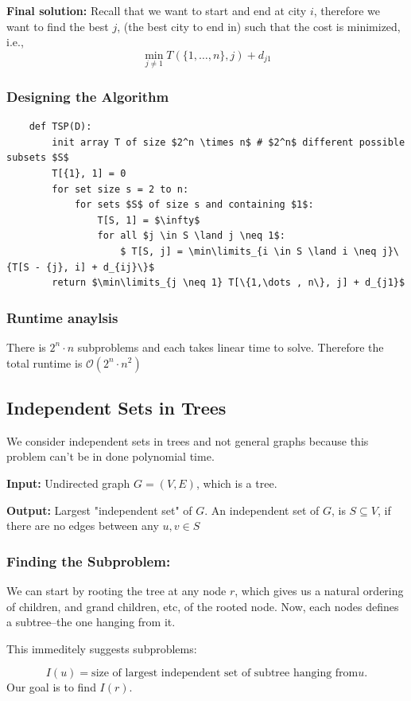 \documentclass[12pt]{article}
\renewcommand{\O}{\mathcal{O}}
\begin{document}
\textbf{Final solution: } Recall that we want to start and end at city $i$, therefore we want to find the best $j$, (the best city to end in) such that the cost is minimized, i.e.,
$$
    \min\limits_{j \neq 1} T(\{1,\dots , n\}, j) + d_{j1}
$$

\subsubsection{Designing the Algorithm}
\begin{lstlisting}
    def TSP(D):
        init array T of size $2^n \times n$ # $2^n$ different possible subsets $S$
        T[{1}, 1] = 0
        for set size s = 2 to n:
            for sets $S$ of size s and containing $1$:
                T[S, 1] = $\infty$
                for all $j \in S \land j \neq 1$:
                    $ T[S, j] = \min\limits_{i \in S \land i \neq j}\{T[S - {j}, i] + d_{ij}\}$
        return $\min\limits_{j \neq 1} T[\{1,\dots , n\}, j] + d_{j1}$
\end{lstlisting}
\subsubsection{Runtime anaylsis}
There is $2^n \cdot n$ subproblems and each takes linear time to solve. Therefore the total runtime is $\O(2^n\cdot n^2)$

\subsection{Independent Sets in Trees}
We consider independent sets in trees and not general graphs because this problem can't be in done polynomial time.

\textbf{Input:} Undirected graph $G = (V, E)$, which is a tree.

\textbf{Output:} Largest "independent set" of $G$. An independent set of $G$, is $S \subseteq V$, if there are no edges between any $u, v \in S$


\subsubsection{Finding the Subproblem:}
We can start by rooting the tree at any node $r$, which gives us a natural ordering of children, and grand children, etc, of the rooted node. Now, each nodes defines a subtree--the one hanging from it.

This immeditely suggests subproblems:

$$
    I(u) = \text{size of largest independent set of subtree hanging from} u.
$$
Our goal is to find $I(r)$.
\end{document}
